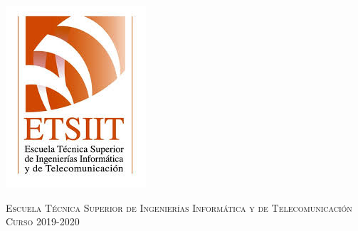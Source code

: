 \begin{titlepage}
\begin{minipage}{\textwidth}
        \includegraphics[scale=0.3]{images/etsiit.jpeg}

        \vspace{0.7cm}
        \textsc{Escuela Técnica Superior de Ingenierías Informática y de Telecomunicación}\\
        \vspace{1cm}
        \textsc{Curso 2019-2020}
    \end{minipage}
\end{titlepage}

